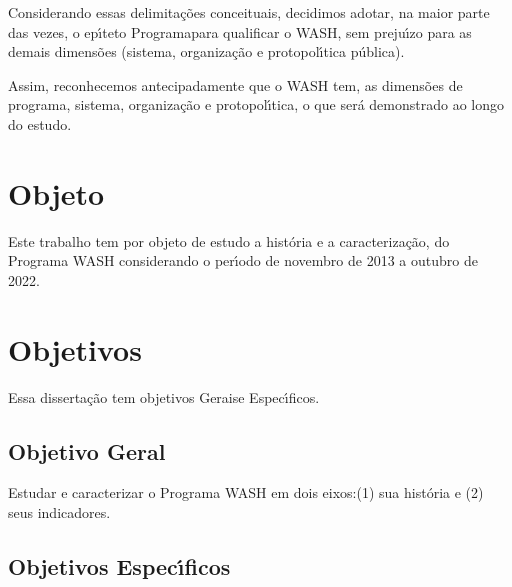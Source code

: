 \documentclass[
12pt,		%
openright,	%
twoside,  %
a4paper,			%
chapter=TITLE,		%
english,			%
french,				%
spanish,			%
brazil				%
]{USPSC-classe/USPSC}
\begin{document}
Considerando essas delimita\c{c}\~oes conceituais, decidimos adotar, na maior parte das vezes, o ep\'{\i}teto \textquotedbl Programa\textquotedbl  para qualificar o WASH, sem preju\'{\i}zo para as demais dimens\~oes (sistema, organiza\c{c}\~ao e protopol\'{\i}tica p\'ublica).









Assim, reconhecemos antecipadamente que o WASH tem, as dimens\~oes de programa, sistema, organiza\c{c}\~ao e protopol\'{\i}tica, o que ser\'a demonstrado ao longo do estudo.









\section[Objeto]{Objeto}\label{Objeto}
Este trabalho tem por objeto de estudo a hist\'oria e a caracteriza\c{c}\~ao, do Programa WASH considerando o per\'{\i}odo de novembro de 2013 a outubro de 2022.









\section[Objetivos]{Objetivos}\label{Objetivos}
Essa disserta\c{c}\~ao tem objetivos  \textquotedbl Gerais\textquotedbl  e \textquotedbl Espec\'{\i}ficos\textquotedbl .









\subsection[Objetivo Geral]{Objetivo Geral}\label{Objetivo Geral}
Estudar e caracterizar o Programa WASH em dois eixos:(1) sua hist\'oria e (2) seus indicadores.









\subsection[Objetivos Espec\'{\i}ficos]{Objetivos Espec\'{\i}ficos}\label{Objetivos Espec\'{\i}ficos}
\end{document}
